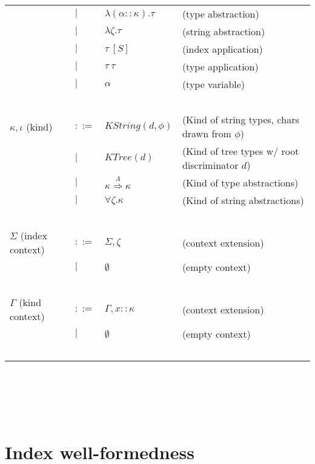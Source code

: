 \documentclass{article}
\begin{document}
\begin{tabular}{llll}
       & $\mid$ & $\lambda (\alpha :: \kappa). \tau$ & (type abstraction) \\
       & $\mid$ & $\lambda \zeta. \tau$ & (string abstraction) \\
       & $\mid$ & $\tau~[S]$ & (index application) \\
       & $\mid$ & $\tau~\tau$ & (type application) \\
       & $\mid$ & $\alpha$ & (type variable) \\~\\
$\kappa, \iota$ (kind) & $::=$ & $\mathit{KString}(d,\phi)$ & (Kind of string types, chars drawn from $\phi$) \\
                         & $\mid$ & $\mathit{KTree}(d)$ & (Kind of tree types w/ root discriminator $d$) \\
                         & $\mid$ & $\kappa \overset{A}{\Rightarrow} \kappa$ & (Kind of type abstractions) \\
                         & $\mid$ & $\forall \zeta. \kappa$ & (Kind of string abstractions) \\~\\
$\Sigma$ (index context) & $::=$ & $\Sigma,\zeta$ & (context extension) \\
                         & $\mid$ & $\emptyset$ & (empty context) \\~\\
$\Gamma$ (kind context) & $::=$ & $\Gamma,x :: \kappa$ & (context extension) \\
                           & $\mid$ & $\emptyset$ & (empty context) \\~\\

\end{tabular}\\~\\~\\
\begin{tabular}{llll}

\end{tabular}

\section*{Index well-formedness}
\end{document}
